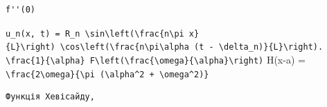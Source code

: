\documentclass[
  ukrainian,
]{article}
\begin{document}
\begin{verbatim}
f''(0)
\end{verbatim}

\texttt{u\_n(x,\ t)\ =\ R\_n\ \textbackslash{}sin\textbackslash{}left(\textbackslash{}frac\{n\textbackslash{}pi\ x\}\{L\}\textbackslash{}right)\ \textbackslash{}cos\textbackslash{}left(\textbackslash{}frac\{n\textbackslash{}pi\textbackslash{}alpha\ (t\ -\ \textbackslash{}delta\_n)\}\{L\}\textbackslash{}right).}
\texttt{\textbackslash{}frac\{1\}\{\textbackslash{}alpha\}\ F\textbackslash{}left(\textbackslash{}frac\{\textbackslash{}omega\}\{\textbackslash{}alpha\}\textbackslash{}right)}
H(x-a) =
\texttt{\textbackslash{}frac\{2\textbackslash{}omega\}\{\textbackslash{}pi\ (\textbackslash{}alpha\^{}2\ +\ \textbackslash{}omega\^{}2)\}}

\begin{verbatim}
Функція Хевісайду,
\end{verbatim}
\end{document}
